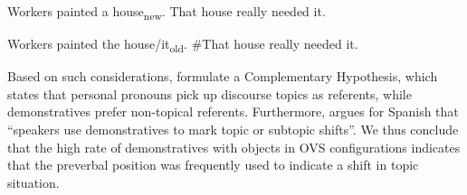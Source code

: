 \documentclass[output=paper,modfonts,nonflat]{langsci/langscibook}
\begin{document}
\ea
Workers painted a house\textsubscript{new}. That house really needed it.\label{dem4}
\z

\ea
Workers painted the house/it\textsubscript{old}. \#That house really needed it.\label{dem5}
\z


Based on such considerations, \citet{BoschEtAl:2003} formulate a Complementary Hypothesis, which states that personal pronouns pick up discourse topics as referents, while demonstratives prefer non-topical referents. Furthermore, \citet[175]{Zulaica:2011} argues for Spanish that ``speakers use demonstratives to mark topic or subtopic shifts''. We thus conclude that the high rate of demonstratives with objects in OVS configurations indicates that the preverbal position was frequently used to indicate a shift in topic situation. %
	


\end{document}
